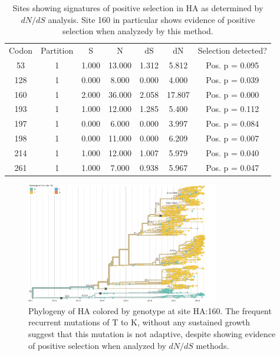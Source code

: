 \documentclass[11pt,oneside,letterpaper]{article}
\begin{document}
\begin{table}[h]
  \caption{Sites showing signatures of positive selection in HA as determined by $dN/dS$ analysis. Site 160 in particular shows evidence of positive selection when analyzedy by this method.}
  \begin{center}
    \begin{tabular}{ccccccc}
    Codon & Partition & S     & N      & dS    & dN     & Selection detected? \\
    53    & 1         & 1.000 & 13.000 & 1.312 & 5.812  & Pos. p = 0.095      \\
    128   & 1         & 0.000 & 8.000  & 0.000 & 4.000  & Pos. p = 0.039      \\
    160   & 1         & 2.000 & 36.000 & 2.058 & 17.807 & Pos. p = 0.000      \\
    193   & 1         & 1.000 & 12.000 & 1.285 & 5.400  & Pos. p = 0.112      \\
    197   & 1         & 0.000 & 6.000  & 0.000 & 3.997  & Pos. p = 0.084      \\
    198   & 1         & 0.000 & 11.000 & 0.000 & 6.209  & Pos. p = 0.007      \\
    214   & 1         & 1.000 & 12.000 & 1.007 & 5.979  & Pos. p = 0.040      \\
    261   & 1         & 1.000 & 7.000  & 0.938 & 5.967  & Pos. p = 0.047
    \end{tabular}
  \end{center}
  \label{sup_tab:hyphy_results}
\end{table}

\begin{figure}[!h]
    \begin{center}
    \includegraphics[width=0.75\textwidth]{../manuscript/in-progress/texfiles/figures/ha1160_tree.png}
    \end{center}
    \caption{Phylogeny of HA colored by genotype at site HA:160. The frequent recurrent mutations of T to K, without any sustained growth suggest that this mutation is not adaptive, despite showing evidence of positive selection when analyzed by $dN/dS$ methods.}
    \label{sup_fig:ha1160}
\end{figure}
\end{document}
